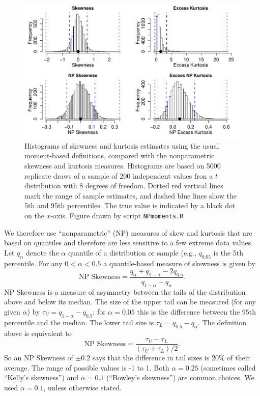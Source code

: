 \documentclass[11pt]{article}
\newcounter{box}
\newcommand{\be}{\begin{equation}}
\newcommand{\ee}{\end{equation}}
\begin{document}
{\begin{figure}[tbp]
\centering
\includegraphics[width=\textwidth]{figures/NPmoments.pdf}
\caption{Histograms of skewness and kurtosis estimates using the usual moment-based definitions, compared with the nonparametric
skewness and kurtosis measures. Histograms are based on 5000 replicate draws of a sample of 200 independent values fron 
a $t$ distribution with 8 degrees of freedom. Dotted red vertical lines mark the range of sample estimates, 
and dashed blue lines show the 5th and 95th percentiles. The true value is indicated by a black dot on the $x$-axis.
Figure drawn by script \texttt{NPmoments.R}}
\label{fig:NPmoments}
\end{figure} 

We therefore use ``nonparametric'' (NP) measures of skew and kurtosis that are based on quantiles and therefore are 
less sensitive to a few extreme data values. Let $q_\alpha$ denote the $\alpha$ quantile of a distribution or sample (e.g., $q_{0.05}$ 
is the 5th percentile. For any $0 < \alpha < 0.5$ a quantile-based measure of skewness is given by \citep{mcgillivray-1986}
\be
\mbox{NP Skewness} = \frac{q_\alpha + q_{1-\alpha} - 2 q_{0.5}}{q_{1-\alpha} - q_\alpha}.
\ee
NP Skewness is a measure of asymmetry between the tails of the distribution above and below its median. The size of the upper
tail can be measured (for any given $\alpha$) by $\tau_U = q_{1-\alpha} - q_{0.5}$; for $\alpha=0.05$ this is the difference
between the 95th percentile and the median. The lower tail size is $\tau_L = q_{0.5} - q_\alpha$. The definition above
is equivalent to  
\be
\mbox{NP Skewness} = \frac{\tau_U - \tau_L}{(\tau_U + \tau_L)/2}.
\label{eqn:NPskew}
\ee
So an NP Skewness of $\pm 0.2$ says that the difference in tail sizes is 20\% of their average. The range of possible values 
is -1 to 1. Both $\alpha=0.25$ (sometimes called ``Kelly's skewness'') and $\alpha=0.1$ (``Bowley's skewness'') 
are common choices. We used $\alpha=0.1$, unless otherwise stated.  
 
}
\end{document}
